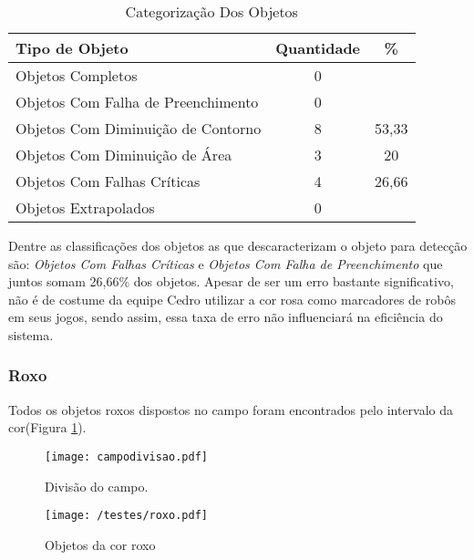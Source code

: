 	\begin{table}[H]
\centering
\begin{tabular}{l|c|c}
Tipo de Objeto & Quantidade  & \% \\ %
\hline                               %
Objetos Completos &  0\\
\hline 
Objetos Com Falha de Preenchimento & 0\\
\hline 
Objetos Com Diminuição de Contorno & 8& 53,33
 \\
\hline 
Objetos Com Diminuição de Área & 3 & 20\\
\hline 
Objetos Com Falhas Críticas & 4 & 26,66 \\
\hline \hline 
Objetos Extrapolados & 0 \\
\hline 
\end{tabular}
\caption{Categorização Dos Objetos}
\label{tab:rosa}
\end{table}

Dentre as classificações dos objetos as que descaracterizam o objeto para detecção são:  \textit{Objetos Com Falhas Críticas} e \textit{Objetos Com Falha de Preenchimento} que juntos somam 26,66\% dos objetos. Apesar de ser um erro bastante significativo, não é de costume da equipe Cedro utilizar a cor rosa como marcadores de robôs em seus jogos, sendo assim, essa taxa de erro não influenciará na eficiência do sistema.
\newpage
\subsubsection{Roxo}


Todos os objetos roxos dispostos no campo foram encontrados pelo intervalo da cor(Figura \ref{fig:roxo}).

\begin{figure}[H]
	\begin{minipage}[b]{0.45\linewidth}
		\centering
		\texttt{[image: campodivisao.pdf]}
		\caption{Divisão do campo.}				
	\end{minipage}
	\hspace{0.5cm}
	\begin{minipage}[b]{0.45\linewidth}
		\centering
		\texttt{[image: /testes/roxo.pdf]}
		\caption{Objetos da cor roxo}
		\label{fig:roxo}
	\end{minipage}
\end{figure}

